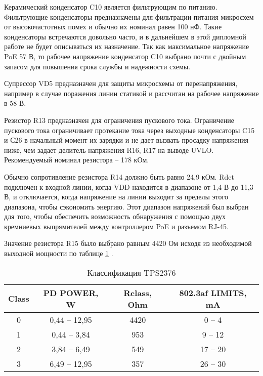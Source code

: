 Керамический конденсатор C10 является фильтрующим по питанию. Фильтрующие конденсаторы предназначены 
для фильтрации питания микросхем от высокочастотных помех и обычно их номинал равен 100 нФ.
Такие конденсаторы встречаются довольно  часто, и в дальнейшем в этой дипломной работе не будет 
описываться их назначение. Так как максимальное напряжение PoE 57 В, то рабочее напряжение 
конденсатор C10 выбрано почти с двойным запасом для повышения срока службы и надежности схемы.

Супрессор VD5 предназначен для защиты микросхемы от перенапряжения, например в случае поражения
линии статикой и рассчитан на рабочее напряжение в 58 В. 

Резистор R13 предназначен для ограничения пускового тока. Ограничение пускового тока ограничивает
протекание тока через выходные конденсаторы C15 и С26 в начальный момент их зарядки и не дает 
вызвать просадку напряжения ниже, чем задает делитель напряжения R16, R17 на выводе UVLO. 
Рекомендуемый номинал резистора -- 178 кОм.  

Обычно сопротивление резистора R14 должно быть равно 24,9 кОм. Rdet подключен к входной линии, 
когда VDD находится в диапазоне от 1,4 В до 11,3 В, и отключается,
когда напряжение на линии выходит за пределы этого диапазона, чтобы сэкономить энергию.
Этот диапазон напряжений был выбран для того, чтобы обеспечить возможность обнаружения с 
помощью двух кремниевых выпрямителей между контроллером PoE и разъемом RJ-45.

Значение резистора R15 было выбрано равным 4420 Ом исходя из 
необходимой выходной мощности по таблице \ref{ClassTPS2376} \cite{TPS2376:datasheet}.

\begin{table}[H]
    \caption{Классификация TPS2376} 
    \label{ClassTPS2376}
    \begin{center}
    \begin{tabular}{|c|c|c|c|}
    \hline
    Class & PD POWER, W  &  Rclass, Ohm   & 802.3af LIMITS, mA \\ \hline
    0 & 0,44 -- 12,95  & 4420 &0 -- 4  \\ \hline
    1 & 0,44 -- 3,84 & 953 & 9 -- 12   \\ \hline
    2 & 3,84 -- 6,49 & 549 & 17 -- 20  \\ \hline
    3 & 6,49 -- 12,95 & 357 & 26 -- 30   \\ \hline
    \end{tabular}
    \end{center}
\end{table} 

